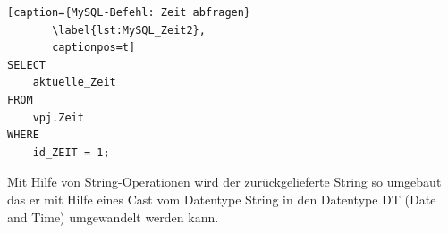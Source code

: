 
\begin{lstlisting}[caption={MySQL-Befehl: Zeit abfragen}
       \label{lst:MySQL_Zeit2},
       captionpos=t] 
SELECT
    aktuelle_Zeit
FROM
    vpj.Zeit
WHERE
    id_ZEIT = 1;
\end{lstlisting}

Mit Hilfe von String-Operationen wird der zurückgelieferte String so umgebaut das er mit Hilfe eines Cast vom Datentype String in den Datentype DT (Date and Time) umgewandelt werden kann. 